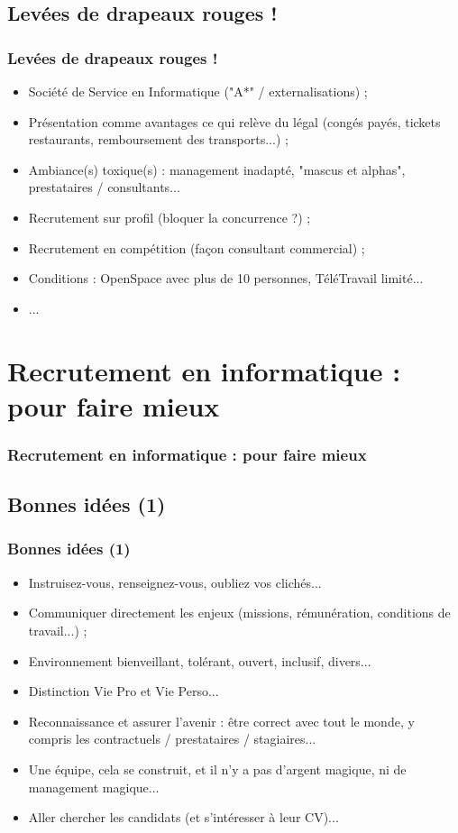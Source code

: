 \documentclass[slidetop,11pt]{beamer}
\begin{document}
\subsection{Lev{\'e}es de drapeaux rouges !}
\begin{frame}
	\frametitle{Lev{\'e}es de drapeaux rouges !}
	\begin{itemize}
		\item Soci{\'e}t{\'e} de Service en Informatique ("A*" / externalisations) ; 
		\item Pr{\'e}sentation comme avantages ce qui rel{\`e}ve du l{\'e}gal (cong{\'e}s pay{\'e}s, tickets restaurants, remboursement des transports...) ; 
		\item Ambiance(s) toxique(s) : management inadapt{\'e}, "mascus et alphas", prestataires / consultants...
		\item Recrutement sur profil (bloquer la concurrence ?) ; 
		\item Recrutement en comp{\'e}tition (fa\c{c}on consultant commercial) ; 
		\item Conditions : OpenSpace avec plus de 10 personnes, T{\'e}l{\'e}Travail limit{\'e}...
		\item ... 
	\end{itemize}
\end{frame}


\section{Recrutement en informatique : pour faire mieux}
\begin{frame}
	\frametitle{Recrutement en informatique : pour faire mieux}
	\tableofcontents[sections=3,currentsection,subsectionstyle=show/shaded/hide] %
\end{frame}

\subsection{Bonnes id{\'e}es (1)}
\begin{frame}
	\frametitle{Bonnes id{\'e}es (1)}
	\begin{itemize}
		\item Instruisez-vous, renseignez-vous, oubliez vos clich{\'e}s...
		\item Communiquer directement les enjeux (missions, r{\'e}mun{\'e}ration, conditions de travail...) ;
		\item Environnement bienveillant, tol{\'e}rant, ouvert, inclusif, divers...
		\item Distinction Vie Pro et Vie Perso...
		\item Reconnaissance et assurer l'avenir : {\^e}tre correct avec tout le monde, y compris les contractuels / prestataires / stagiaires...
		\item Une {\'e}quipe, cela se construit, et il n'y a pas d'argent magique, ni de management magique...
		\item Aller chercher les candidats (et s'int{\'e}resser {\`a} leur CV)...
	\end{itemize} 
\end{frame}
\end{document}
